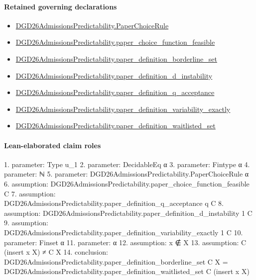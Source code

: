 \documentclass[10pt]{article}
\begin{document}
\paragraph{Retained governing declarations}
\begin{itemize}\raggedright
\item \hyperlink{governing-declaration-4678951b4432b184}{DGD26\allowbreak{}Admissions\allowbreak{}Predictability.\allowbreak{}Paper\allowbreak{}Choice\allowbreak{}Rule}
\item \hyperlink{governing-declaration-f7de74a44053f6d5}{DGD26\allowbreak{}Admissions\allowbreak{}Predictability.\allowbreak{}paper\_\allowbreak{}choice\_\allowbreak{}function\_\allowbreak{}feasible}
\item \hyperlink{governing-declaration-6c36470804ab6581}{DGD26\allowbreak{}Admissions\allowbreak{}Predictability.\allowbreak{}paper\_\allowbreak{}definition\_\allowbreak{}borderline\_\allowbreak{}set}
\item \hyperlink{governing-declaration-ce2c1c7a5233a84a}{DGD26\allowbreak{}Admissions\allowbreak{}Predictability.\allowbreak{}paper\_\allowbreak{}definition\_\allowbreak{}d\_\allowbreak{}instability}
\item \hyperlink{governing-declaration-7ecd62274fb2f391}{DGD26\allowbreak{}Admissions\allowbreak{}Predictability.\allowbreak{}paper\_\allowbreak{}definition\_\allowbreak{}q\_\allowbreak{}acceptance}
\item \hyperlink{governing-declaration-ce6697be3f1c2256}{DGD26\allowbreak{}Admissions\allowbreak{}Predictability.\allowbreak{}paper\_\allowbreak{}definition\_\allowbreak{}variability\_\allowbreak{}exactly}
\item \hyperlink{governing-declaration-71a9b48ca3997cb7}{DGD26\allowbreak{}Admissions\allowbreak{}Predictability.\allowbreak{}paper\_\allowbreak{}definition\_\allowbreak{}waitlisted\_\allowbreak{}set}
\end{itemize}
\paragraph{Lean-elaborated claim roles}\begin{ReviewVerbatim}
1. parameter: Type u_1
2. parameter: DecidableEq α
3. parameter: Fintype α
4. parameter: ℕ
5. parameter: DGD26AdmissionsPredictability.PaperChoiceRule α
6. assumption: DGD26AdmissionsPredictability.paper_choice_function_feasible C
7. assumption: DGD26AdmissionsPredictability.paper_definition_q_acceptance q C
8. assumption: DGD26AdmissionsPredictability.paper_definition_d_instability 1 C
9. assumption: DGD26AdmissionsPredictability.paper_definition_variability_exactly 1 C
10. parameter: Finset α
11. parameter: α
12. assumption: x ∉ X
13. assumption: C (insert x X) ≠ C X
14. conclusion: DGD26AdmissionsPredictability.paper_definition_borderline_set C X =
  DGD26AdmissionsPredictability.paper_definition_waitlisted_set C (insert x X)
\end{ReviewVerbatim}
\end{document}
